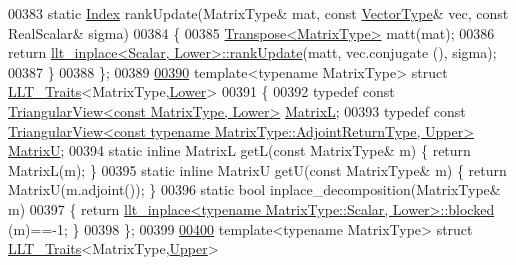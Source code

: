 \begin{DoxyCode}
00383   \textcolor{keyword}{static} \hyperlink{namespace_eigen_a62e77e0933482dafde8fe197d9a2cfde}{Index} rankUpdate(MatrixType& mat, \textcolor{keyword}{const} \hyperlink{struct_vector_type}{VectorType}& vec, \textcolor{keyword}{const} RealScalar& sigma)
00384   \{
00385     \hyperlink{group___core___module_class_eigen_1_1_transpose}{Transpose<MatrixType>} matt(mat);
00386     \textcolor{keywordflow}{return} \hyperlink{struct_eigen_1_1internal_1_1llt__inplace}{llt\_inplace<Scalar, Lower>::rankUpdate}(matt, vec.conjugate
      (), sigma);
00387   \}
00388 \};
00389 
\hyperlink{struct_eigen_1_1internal_1_1_l_l_t___traits_3_01_matrix_type_00_01_lower_01_4}{00390} \textcolor{keyword}{template}<\textcolor{keyword}{typename} MatrixType> \textcolor{keyword}{struct }\hyperlink{struct_eigen_1_1internal_1_1_l_l_t___traits}{LLT\_Traits}<MatrixType,\hyperlink{group__enums_gga39e3366ff5554d731e7dc8bb642f83cda891792b8ed394f7607ab16dd716f60e6}{Lower}>
00391 \{
00392   \textcolor{keyword}{typedef} \textcolor{keyword}{const} \hyperlink{group___core___module_class_eigen_1_1_triangular_view}{TriangularView<const MatrixType, Lower>} 
      \hyperlink{group___core___module_class_eigen_1_1_triangular_view}{MatrixL};
00393   \textcolor{keyword}{typedef} \textcolor{keyword}{const} 
      \hyperlink{group___core___module_class_eigen_1_1_triangular_view}{TriangularView<const typename MatrixType::AdjointReturnType, Upper>}
       \hyperlink{group___core___module_class_eigen_1_1_triangular_view}{MatrixU};
00394   \textcolor{keyword}{static} \textcolor{keyword}{inline} MatrixL getL(\textcolor{keyword}{const} MatrixType& m) \{ \textcolor{keywordflow}{return} MatrixL(m); \}
00395   \textcolor{keyword}{static} \textcolor{keyword}{inline} MatrixU getU(\textcolor{keyword}{const} MatrixType& m) \{ \textcolor{keywordflow}{return} MatrixU(m.adjoint()); \}
00396   \textcolor{keyword}{static} \textcolor{keywordtype}{bool} inplace\_decomposition(MatrixType& m)
00397   \{ \textcolor{keywordflow}{return} \hyperlink{struct_eigen_1_1internal_1_1llt__inplace}{llt\_inplace<typename MatrixType::Scalar, Lower>::blocked}
      (m)==-1; \}
00398 \};
00399 
\hyperlink{struct_eigen_1_1internal_1_1_l_l_t___traits_3_01_matrix_type_00_01_upper_01_4}{00400} \textcolor{keyword}{template}<\textcolor{keyword}{typename} MatrixType> \textcolor{keyword}{struct }\hyperlink{struct_eigen_1_1internal_1_1_l_l_t___traits}{LLT\_Traits}<MatrixType,\hyperlink{group__enums_gga39e3366ff5554d731e7dc8bb642f83cda6bcb58be3b8b8ec84859ce0c5ac0aaec}{Upper}>

\end{DoxyCode}
